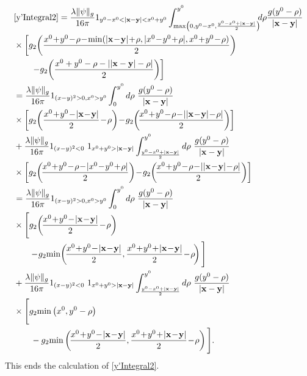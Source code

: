 \documentclass[b5paper,draft,openbib,12pt]{memoir}
\newcommand{\vx}{\mathbf{x}}
\newcommand{\vy}{\mathbf{y}}
\begin{document}
\begin{align}
    &\eqref{y'Integral2}=\frac{\lambda\|\psi\|_g}{16\pi} 1_{y^0-x^0<|\vx-\vy|<x^0+y^0} \int_{\max \left(0,y^0-x^0, \frac{y^0-x^0+|\vx-\vy|}{2} \right)}^{y^0} \!\!\!d\rho \frac{g(y^0-\rho)}{|\vx-\vy|}\nonumber\\
    &\times \left[g_2\!\left(\frac{x^0\!+\!y^0\!-\!\rho\!-\!\min(|\vx\!-\!\vy|\!+\!\rho,|x^0\!-\!y^0\!+\!\rho|,x^0\!+\!y^0\!-\!\rho)}{2} \right)\right.\nonumber\\
    &\left.\quad\quad  -g_2\!\left( \frac{x^0+y^0-\rho-||\vx-\vy|-\rho|}{2} \right) \right] \nonumber\\
    &= \frac{\lambda \|\psi\|_g}{16\pi} 1_{(x-y)^2>0, x^0>y^0} \int_{0}^{y^0} d\rho  ~\frac{ g(y^0-\rho)}{|\vx-\vy|}\nonumber\\
    &\times\left[ g_2\!\left(\frac{x^0\!+\!y^0 \!-\! |\vx\!-\!\vy|}{2}\!-\!\rho\right)
    \!-\!g_2\!\left(\!\frac{x^0\!+\!y^0\!-\!\rho \!-\! ||\vx\!-\!\vy|\!-\!\rho|}{2}\right)\right]\nonumber\\
    &+ \frac{\lambda \|\psi\|_g}{16\pi} 1_{(x-y)^2<0}~1_{ x^0+y^0>|\vx-\vy|} \int_{\frac{y^0-x^0+|\vx-\vy|}{2}}^{y^0} d\rho  ~\frac{ g(y^0-\rho)}{|\vx-\vy|}\nonumber\\
    &\times \left[ g_2\!\left(\!\frac{x^0\!+\!y^0\!-\!\rho \!-\! |x^0\!-\!y^0\!+\!\rho|}{2}\right)
    \!-\!g_2\!\left(\!\frac{x^0\!+\!y^0\!-\!\rho \!-\! ||\vx\!-\!\vy|\!-\!\rho|}{2}\right)\right]\nonumber\\
    &= \frac{\lambda \|\psi\|_g}{16\pi} 1_{(x-y)^2>0, x^0>y^0} \int_{0}^{y^0} d\rho  ~\frac{ g(y^0-\rho)}{|\vx-\vy|}\nonumber\\
    &\times \Bigg[ g_2\!\left(\!\frac{x^0\!+\!y^0 \!-\! |\vx\!-\!\vy|}{2}\!-\!\rho\right)\\
    &\quad \quad \!-\!g_2\!\min\!\left(\!\frac{x^0\!+\!y^0 \!-\! |\vx\!-\!\vy|}{2},\frac{x^0\!+\!y^0 \!+\! |\vx\!-\!\vy|}{2}\!-\!\rho\!\right)\Bigg]\nonumber\\
    &+ \frac{\lambda \|\psi\|_g}{16\pi} 1_{(x-y)^2<0}~1_{ x^0+y^0>|\vx-\vy|} \int_{\frac{y^0-x^0+|\vx-\vy|}{2}}^{y^0} d\rho ~ \frac{ g(y^0-\rho)}{|\vx-\vy|}\nonumber\\
    &\times \Bigg[ g_2\!\min\left(x^0,y^0-\rho\right)\notag\\
    &\quad \quad -g_2\!\min\left(\!\frac{x^0\!+\!y^0\!-\! |\vx\!-\!\vy|}{2},\frac{x^0\!+\!y^0\!+\! |\vx\!-\!\vy|}{2}\!-\!\rho\right)\Bigg].
\label{eq:resulty'Integral2}
\end{align}
This ends the calculation of \eqref{y'Integral2}. 
\end{document}
